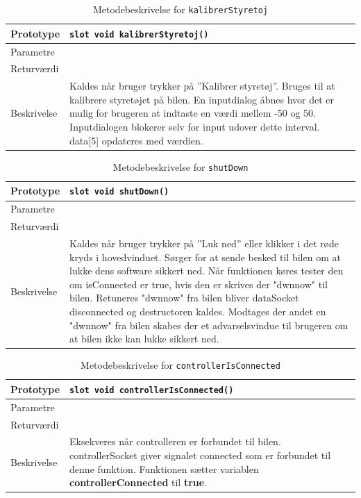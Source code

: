 \begin{table}[H]
\begin{tabularx}{\textwidth}{| L{2.5 cm} | Z |} \hline
Prototype & \texttt{slot void kalibrerStyretoj()} \\\hline
Parametre &   \\\hline
Returværdi &  \\\hline
Beskrivelse & Kaldes når bruger trykker på ''Kalibrer styretøj''. Bruges til at kalibrere styretøjet på bilen. En inputdialog åbnes hvor det er mulig for brugeren at indtaste en værdi mellem -50 og 50. Inputdialogen blokerer selv for input udover dette interval. data[5] opdateres med værdien. \\\hline
\end{tabularx}
\caption{Metodebeskrivelse for \texttt{kalibrerStyretoj}}
\label{table:met_kalibrerStyretoj}
\end{table}

\begin{table}[H]
\begin{tabularx}{\textwidth}{| L{2.5 cm} | Z |} \hline
Prototype & \texttt{slot void shutDown()} \\\hline
Parametre &   \\\hline
Returværdi &  \\\hline
Beskrivelse & Kaldes når bruger trykker på ''Luk ned'' eller klikker i det røde kryds i hovedvinduet. Sørger for at sende besked til bilen om at lukke dens software sikkert ned. Når funktionen køres tester den om isConnected er true, hvis den er skrives der "dwnnow" til bilen. Retuneres "dwnnow" fra bilen bliver dataSocket disconnected og destructoren kaldes. Modtages der andet en "dwnnow" fra bilen skabes der et advarselsvindue til brugeren om at bilen ikke kan lukke sikkert ned. \\\hline
\end{tabularx}
\caption{Metodebeskrivelse for \texttt{shutDown}}
\label{table:met_shutDown}
\end{table}

\begin{table}[H]
\begin{tabularx}{\textwidth}{| L{2.5 cm} | Z |} \hline
Prototype & \texttt{slot void controllerIsConnected()} \\\hline
Parametre &   \\\hline
Returværdi &  \\\hline
Beskrivelse & Eksekveres når controlleren er forbundet til bilen. controllerSocket giver signalet connected som er forbundet til denne funktion. Funktionen sætter variablen \textbf{controllerConnected} til \textbf{true}.   \\\hline
\end{tabularx}
\caption{Metodebeskrivelse for \texttt{controllerIsConnected}}
\label{table:met_controllerIsConnected}
\end{table}

